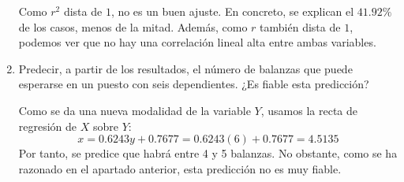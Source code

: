 \begin{ejercicio}
\begin{enumerate}
        Como $r^2$ dista de $1$, no es un buen ajuste. En concreto, se explican el $41.92\%$ de los casos, menos de la mitad. Además, como $r$ también dista de $1$, podemos ver que no hay una correlación lineal alta entre ambas variables. 
    
        \item Predecir, a partir de los resultados, el número de balanzas que puede esperarse en un puesto con seis dependientes. ¿Es fiable esta predicción?
        
        Como se da una nueva modalidad de la variable $Y$, usamos la recta de regresión de $X$ sobre $Y$:
        \begin{equation*}
            x = 0.6243y +0.7677 = 0.6243(6) +0.7677 = 4.5135
        \end{equation*}
        Por tanto, se predice que habrá entre 4 y 5 balanzas. No obstante, como se ha razonado en el apartado anterior, esta predicción no es muy fiable.
    \end{enumerate}
\end{ejercicio}

